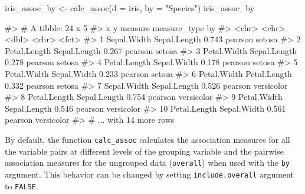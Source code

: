 \begin{Schunk}
\begin{Sinput}
iris_assoc_by <- calc_assoc(d = iris,
                            by = "Species")
iris_assoc_by
\end{Sinput}
\begin{Soutput}
#> # A tibble: 24 x 5
#>    x            y            measure measure_type by        
#>    <chr>        <chr>          <dbl> <chr>        <fct>     
#>  1 Sepal.Width  Sepal.Length   0.743 pearson      setosa    
#>  2 Petal.Length Sepal.Length   0.267 pearson      setosa    
#>  3 Petal.Width  Sepal.Length   0.278 pearson      setosa    
#>  4 Petal.Length Sepal.Width    0.178 pearson      setosa    
#>  5 Petal.Width  Sepal.Width    0.233 pearson      setosa    
#>  6 Petal.Width  Petal.Length   0.332 pearson      setosa    
#>  7 Sepal.Width  Sepal.Length   0.526 pearson      versicolor
#>  8 Petal.Length Sepal.Length   0.754 pearson      versicolor
#>  9 Petal.Width  Sepal.Length   0.546 pearson      versicolor
#> 10 Petal.Length Sepal.Width    0.561 pearson      versicolor
#> # ... with 14 more rows
\end{Soutput}
\end{Schunk}

By default, the function \texttt{calc\_assoc} calculates the association
measures for all the variable pairs at different levels of the grouping
variable and the pairwise association measures for the ungrouped data
(\texttt{overall}) when used with the \texttt{by} argument. This
behavior can be changed by setting \texttt{include.overall} argument to
\texttt{FALSE}.

